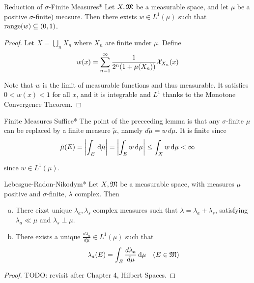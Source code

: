 \begin{lemma}{Reduction of \(\sigma\)-Finite Measures}*
    Let \(X, \mathfrak{M}\) be a measurable space, and let \(\mu\) be a positive \(\sigma\)-finite) measure. Then there exists \(w \in L^1(\mu)\) such that \(\operatorname{range}(w) \subseteq (0, 1)\). 
\end{lemma}

\begin{proof}
    Let \(X = \bigcup_n X_n\) where \(X_n\) are finite under \(\mu\). Define 
    \[
        w(x) = \sum_{n=1}^\infty \frac{1}{2^n(1 + \mu(X_n))} \mathcal{X}_{X_n}(x)
    \]

    Note that \(w\) is the limit of measurable functions and thus measurable. It satisfies \(0 < w(x) < 1\) for all \(x\), and it is integrable and \(L^1\) thanks to the Monotone Convergence Theorem. 
\end{proof}

\begin{remark}{Finite Measures Suffice}*
    The point of the preceeding lemma is that any \(\sigma\)-finite \(\mu\) can be replaced by a finite measure \(\tilde{\mu}\), namely \(d \tilde{\mu} = w \, d\mu\). It is finite since 
    \[
        \tilde{\mu}(E) = \left| \int_E \, \mathrm{d}\tilde{\mu} \right| 
        = \left| \int_E w \, \mathrm{d}\mu \right|
        \leq \int_X w \, \mathrm{d}\mu
        < \infty
    \]

    since \(w \in L^1(\mu)\).
\end{remark}

\begin{theorem}{Lebesgue-Radon-Nikodym}*
    Let \(X, \mathfrak{M}\) be a measurable space, with measures \(\mu\) positive and \(\sigma\)-finite, \(\lambda\) complex. Then 
    \begin{enumerate}[(a)]
        \itemsep0em
        \item There eixst unique \(\lambda_a, \lambda_s\) complex measures such that \(\lambda = \lambda_a + \lambda_s\), satisfying \(\lambda_a \ll \mu\) and \(\lambda_s \perp \mu\).
        \item There exists a unique \(\frac{d\lambda_a}{d\mu} \in L^1(\mu)\) such that
        \[
            \lambda_a(E) = \int_E \frac{d\lambda_a}{d\mu} \, \mathrm{d}\mu
            \quad (E \in \mathfrak{M})
        \]
    \end{enumerate}
\end{theorem}

\begin{proof}
    TODO: revisit after Chapter 4, Hilbert Spaces. 
\end{proof}

